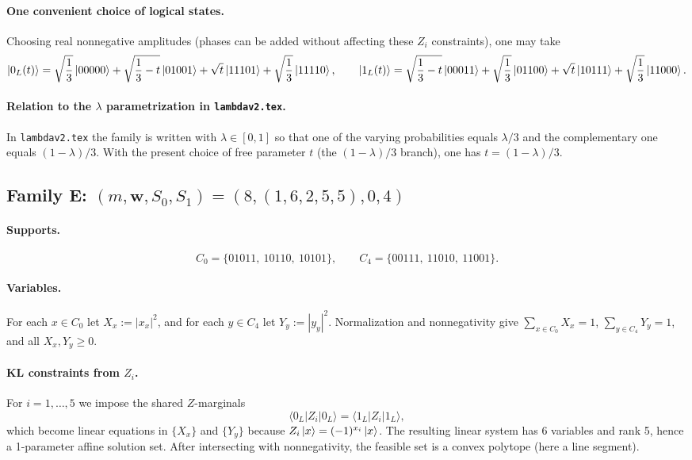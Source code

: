 \documentclass[11pt]{article}
\begin{document}
\paragraph{One convenient choice of logical states.}
Choosing real nonnegative amplitudes (phases can be added without affecting these $Z_i$ constraints), one may take
\[
\ket{0_L(t)} = \sqrt{\frac{1}{3}}\ket{00000} + \sqrt{\frac{1}{3} - t}\ket{01001} + \sqrt{t}\ket{11101} + \sqrt{\frac{1}{3}}\ket{11110},\qquad \ket{1_L(t)} = \sqrt{\frac{1}{3} - t}\ket{00011} + \sqrt{\frac{1}{3}}\ket{01100} + \sqrt{t}\ket{10111} + \sqrt{\frac{1}{3}}\ket{11000}.
\]
\paragraph{Relation to the $\lambda$ parametrization in \texttt{lambdav2.tex}.}
In \texttt{lambdav2.tex} the family is written with $\lambda\in[0,1]$ so that one of the varying probabilities equals $\lambda/3$ and the complementary one equals $(1-\lambda)/3$. With the present choice of free parameter $t$ (the $(1-\lambda)/3$ branch), one has $t=(1-\lambda)/3$.


\subsection{Family E: $(m,\mathbf w,S_0,S_1)=(8,(1,6,2,5,5),0,4)$}

\paragraph{Supports.}
\[
C_0 = \{01011,\ 10110,\ 10101\},\qquad C_4 = \{00111,\ 11010,\ 11001\}.
\]

\paragraph{Variables.}
For each $x\in C_0$ let $X_x:=|x_x|^2$, and for each $y\in C_4$ let $Y_y:=|y_y|^2$.
Normalization and nonnegativity give $\sum_{x\in C_0}X_x=1$, $\sum_{y\in C_4}Y_y=1$, and all $X_x,Y_y\ge 0$.

\paragraph{KL constraints from $Z_i$.}
For $i=1,\dots,5$ we impose the shared $Z$-marginals
\[
\langle 0_L|Z_i|0_L\rangle=\langle 1_L|Z_i|1_L\rangle,
\]
which become linear equations in $\{X_x\}$ and $\{Y_y\}$ because $Z_i\ket{x}=(-1)^{x_i}\ket{x}$.
The resulting linear system has 6 variables and rank 5, hence a 1-parameter affine solution set. After intersecting with nonnegativity, the feasible set is a convex polytope (here a line segment).
\end{document}
